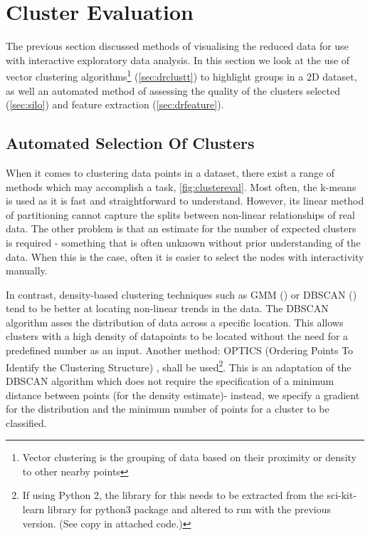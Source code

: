 \section{Cluster Evaluation}
The previous section discussed methods of visualising the reduced data for use with interactive exploratory data analysis. In this section we look at the use of vector clustering algorithms\footnote{Vector clustering is the grouping of data based on their proximity or density to other nearby points} (\autoref{sec:drclustt}) to highlight groups in a 2D dataset, as well an automated method of assessing the quality of the clusters selected (\autoref{sec:silo}) and feature extraction (\autoref{sec:drfeature}).



\subsection{Automated Selection Of Clusters}\label{sec:drclustt}
    When it comes to clustering data points in a dataset, there exist a range of methods which may accomplish a task, \autoref{fig:clustereval}. Most often, the k-means \citep{kmeans} is used as it is fast and straightforward to understand. However, its linear method of partitioning cannot capture the splits between non-linear relationships of real data. The other problem is that an estimate for the number of expected clusters is required - something that is often unknown without prior understanding of the data. When this is the case, often it is easier to select the nodes with interactivity manually.

In contrast, density-based clustering techniques such as GMM (\citep{scikit}) or DBSCAN (\citep{DBSCAN}) tend to be better at locating non-linear trends in the data. The DBSCAN algorithm asses the distribution of data across a specific location. This allows clusters with a high density of datapoints to be located without the need for a predefined number as an input. Another method: OPTICS (Ordering Points To Identify the Clustering Structure) \citep{optics}, shall be used\footnote{ If using Python 2, the library for this needs to be extracted from the sci-kit-learn library for python3 package and altered to run with the previous version. (See copy in attached code.)}. This is an adaptation of the DBSCAN algorithm which does not require the specification of a minimum distance between points (for the density estimate)- instead, we specify a gradient for the distribution and the minimum number of points for a cluster to be classified.


